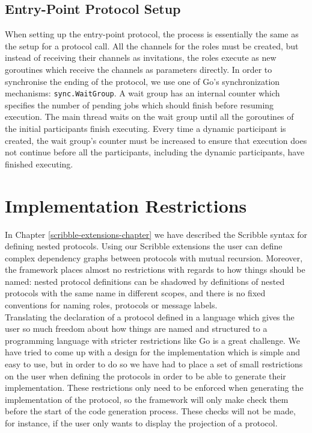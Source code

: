 \documentclass[12pt,twoside]{report}
\begin{document}
\subsection{Entry-Point Protocol Setup}

When setting up the entry-point protocol, the process is essentially the same as the setup for a protocol call. All the channels for the roles must be created, but instead of receiving their channels as invitations, the roles execute as new goroutines which receive the channels as parameters directly. In order to synchronise the ending of the protocol, we use one of Go's synchronization mechanisms: \texttt{sync.WaitGroup}. A wait group has an internal counter which specifies the number of pending jobs which should finish before resuming execution. The main thread waits on the wait group until all the goroutines of the initial participants finish executing. Every time a dynamic participant is created, the wait group's counter must be increased to ensure that execution does not continue before all the participants, including the dynamic participants, have finished executing.

\section{Implementation Restrictions}\label{implementation-restrictions}
In Chapter \ref{scribble-extensions-chapter} we have described the Scribble syntax for defining nested protocols. Using our Scribble extensions the user can define complex dependency graphs between protocols with mutual recursion. Moreover, the framework places almost no restrictions with regards to how things should be named: nested protocol definitions can be shadowed by definitions of nested protocols with the same name in different scopes, and there is no fixed conventions for naming roles, protocols or message labels.\\

Translating the declaration of a protocol defined in a language which gives the user so much freedom about how things are named and structured to a programming language with stricter restrictions like Go is a great challenge. We have tried to come up with a design for the implementation which is simple and easy to use, but in order to do so we have had to place a set of small restrictions on the user when defining the protocols in order to be able to generate their implementation. These restrictions only need to be enforced when generating the implementation of the protocol, so the framework will only make check them before the start of the code generation process. These checks will not be made, for instance, if the user only wants to display the projection of a protocol.
\end{document}
